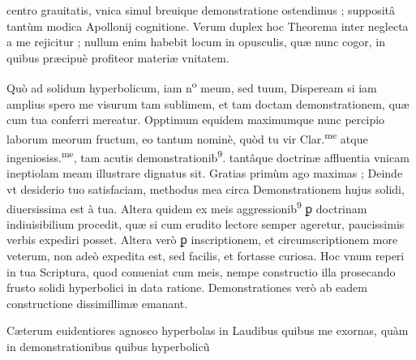 \documentclass[11pt,a4paper]{article}
\begin{document}

centro grauitatis, vnica simul breuique demonstratione ostendimus ; suppositâ tantùm modica Apollonij cognitione. Verum duplex hoc Theorema inter neglecta a me rejicitur ; nullum enim habebit locum in opusculis, quæ nunc  cogor, in quibus præcipuè profiteor materiæ vnitatem.

Quò ad solidum hyperbolicum, iam n\textsuperscript{o} meum, sed tuum, Dispeream si iam amplius spero me visurum tam sublimem, et tam doctam demonstrationem, quæ cum tua conferri mereatur. Opptimum equidem maximumque nunc percipio laborum meorum fructum, eo tantum nominè, quòd tu vir Clar.\textsuperscript{me} atque ingeniosiss.\textsuperscript{me}, tam acutis demonstrationib\textsuperscript{9}. tantâque doctrinæ affluentia vnicam ineptiolam meam illustrare dignatus sit. Gratias primùm ago maximas ; Deinde vt desiderio tuo satisfaciam, methodus mea circa Demonstrationem hujus solidi, diuersissima est à tua. Altera quidem ex meis aggressionib\textsuperscript{9} ꝑ doctrinam indiuisibilium procedit, quæ si cum erudito lectore semper ageretur, paucissimis verbis expediri posset. Altera verò ꝑ inscriptionem, et circumscriptionem more veterum, non adeò expedita est, sed facilis, et fortasse curiosa. Hoc vnum reperi in tua Scriptura, quod conueniat cum meis, nempe constructio illa prosecando frusto solidi hyperbolici in data ratione. Demonstrationes verò ab eadem constructione dissimillimæ emanant.

Cæterum euidentiores agnosco hyperbolas in Laudibus quibus me exornas, quàm in demonstrationibus quibus hyperbolicũ

\end{document}
